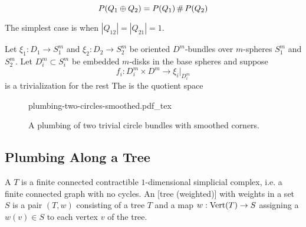 \[
		P(Q_1\oplus Q_2) = P(Q_1)\,\#\, P(Q_2)
\]

The simplest case is when $|Q_{12}|=|Q_{21}|=1$.


\begin{definition}
	Let $\xi_1 : D_1 \to S^m_1$ and $\xi_2 : D_2 \to S^m_2$ be oriented $D^m$-bundles over $m$-spheres $S^m_1$ and $S^m_2$. Let $D^m_i \subset S^m_i$ be embedded $m$-disks in the base spheres and suppose 
	\[f_i : D_i^m\times D^m \to \xi_i|_{D_i^m}\]
	is a trivialization for the rest 
	The  is the quotient space
\end{definition}

\begin{remark}
\end{remark}

\begin{figure}[ht]\label{fig:plumbing-two-circles}
\centering
{plumbing-two-circles-smoothed.pdf_tex}
\caption{A plumbing of two trivial circle bundles with smoothed corners.}
\end{figure}


\subsection*{Plumbing Along a Tree}

\begin{definition}
	A  $T$ is a finite connected contractible $1$-dimensional simplicial complex, i.e. a finite connected graph with no cycles. An [tree (weighted)] with weights in a set $S$ is a pair $(T,w)$ consisting of a tree $T$ and a map $w : {\operatorname{Vert}}(T) \to S$ assigning a  $w(v)\in S$ to each vertex $v$ of the tree.
\end{definition}

